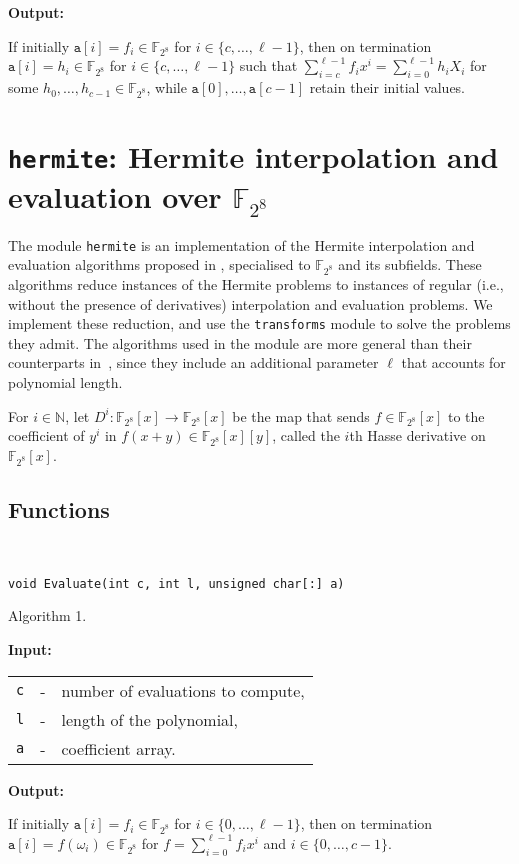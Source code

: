 \documentclass{amsart}
\makeatletter
\newcommand{\F}{\mathbb{F}}
\newcommand{\N}{\mathbb{N}}
\newcommand{\Input}{\textbf{Input:}}
\newcommand{\Output}{\textbf{Output:}}
\newcommand{\transforms}{\normalfont\texttt{transforms}}
\newcommand{\hermite}{\normalfont\texttt{hermite}}
\newenvironment{inputs}{\Input\par\begin{tabular}{@{}rcl}}{\end{tabular}}
\newenvironment{outputs}{\Output\par}{}
\makeatother
\begin{document}
\begin{outputs}
	If initially $\texttt{a}[i]=f_i\in\F_{2^8}$ for ${i\in\{c,\dotsc,\ell-1\}}$,
	then on termination $\texttt{a}[i]=h_i\in\F_{2^8}$ for $i\in\{c,\dotsc,\ell-1\}$
	such that
	$\sum^{\ell-1}_{i=c}f_ix^i=\sum^{\ell-1}_{i=0}h_iX_i$ for some
	$h_0,\dots,h_{c-1}\in\F_{2^8}$, while $\texttt{a}[0],\dotsc,\texttt{a}[c-1]$
	retain their initial values.
\end{outputs}

\section{\hermite{}: Hermite interpolation and evaluation over $\F_{2^8}$}

The module \hermite{} is an implementation of the Hermite interpolation and
evaluation algorithms proposed in \cite{coxon2018}, specialised to $\F_{2^8}$
and its subfields. These algorithms reduce instances of the Hermite problems to
instances of regular (i.e., without the presence of derivatives) interpolation
and evaluation problems. We implement these reduction, and use the \transforms{}
module to solve the problems they admit. The algorithms used in the module are
more general than their counterparts in~\cite{coxon2018}, since they include an
additional parameter $\ell$ that accounts for polynomial length.

For $i\in\N$, let $D^i:\F_{2^8}[x]\rightarrow\F_{2^8}[x]$ be the map that sends
$f\in\F_{2^8}[x]$ to the coefficient of $y^i$ in $f(x+y)\in\F_{2^8}[x][y]$,
called the $i$th Hasse derivative on $\F_{2^8}[x]$.

\subsection{Functions}\

\texttt{void Evaluate(int c, int l, unsigned char[:]\ a)}

Algorithm 1.

\begin{inputs}
	\texttt{c} & - & number of evaluations to compute, \\
	\texttt{l} & - & length of the polynomial,         \\
	\texttt{a} & - & coefficient array.
\end{inputs}

\begin{outputs}
	If initially $\texttt{a}[i]=f_i\in\F_{2^8}$ for $i\in\{0,\dotsc,\ell-1\}$, then
	on termination $\texttt{a}[i]=f(\omega_i)\in\F_{2^8}$ for
	$f=\sum^{\ell-1}_{i=0}f_ix^i$ and $i\in\{0,\dotsc,c-1\}$.
\end{outputs}
\end{document}
